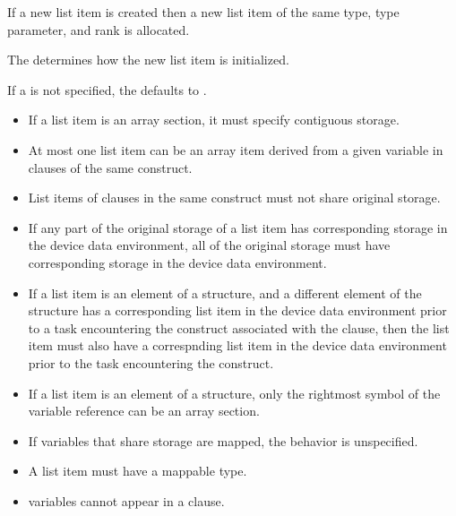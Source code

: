 \fortranspecificstart
If a new list item is created then a new list item of the same type, type parameter, and
rank is allocated.
\fortranspecificend

The  determines how the new list item is initialized.

If a  is not specified, the  defaults to .

\restrictions
\begin{itemize}
\item If a list item is an array section, it must specify contiguous storage.

\item At most one list item can be an array item derived from a given variable in 
clauses of the same construct.

\item List items of  clauses in the same construct must not share original storage.

\item If any part of the original storage of a list item has corresponding storage in the device data environment, all of the original storage must have corresponding storage in the device data environment. 

\item If a list item is an element of a structure, and a different element 
of the structure has a corresponding list item in the device data environment 
prior to a task encountering the construct associated with the  
clause, then the list item must also have a correspnding list item in the 
device data environment prior to the task encountering the construct.

\item If a list item is an element of a structure, only the rightmost symbol of the variable reference can be an array section.

\item If variables that share storage are mapped, the behavior is unspecified. 

\item A list item must have a mappable type.

\item {} variables cannot appear in a  clause.
\end{itemize}

